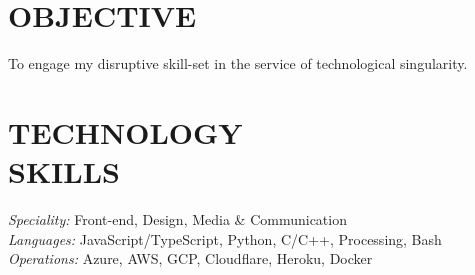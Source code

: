 \documentclass[margin, 10pt]{res} %
\begin{document}
\begin{resume}

\section{OBJECTIVE}  
To engage my disruptive skill-set in the service of technological singularity.


\section{TECHNOLOGY \\ SKILLS} 

{\sl Speciality:} Front-end, Design, Media \& Communication \\
{\sl Languages:} JavaScript/TypeScript, Python, C/C++, Processing, Bash\\
{\sl Operations:} Azure, AWS, GCP, Cloudflare, Heroku, Docker



\end{resume}
\end{document}
